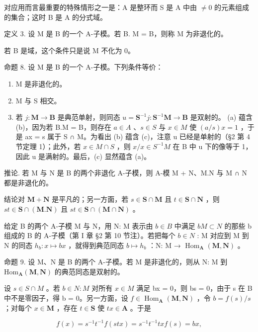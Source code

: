 对应用而言最重要的特殊情形之一是：A 是整环而 S 是 A 中由 \(\neq0\) 的元素组成的集合；这时 B 是 A 的分式域。

定义 3. 设 M 是 B 的一个 A-子模。若 B. M = B，则称 M 为非退化的。

若 B 是域，这个条件只是说 M 不化为 0。

命题 8. 设 M 是 B 的一个 A-子模。下列条件等价：

\begin{enumerate}
\def\labelenumi{(\alph{enumi})}
\item
  M 是非退化的。
\item
  M 与 S 相交。
\item
  若 \(j: \mathbf{M} \to \mathbf{B}\) 是典范单射，则同态 \(u = \mathbf{S}^{-1}j: \mathbf{S}^{-1}\mathbf{M} \to \mathbf{B}\) 是双射的。
  (a) 蕴含 (b)，因为若 B.M = B，则存在 \(a \in A\) 、\(s \in S\) 与 \(x \in M\) 使 \((a/s)x = 1\) ，于是 ax = s 属于 S ∩ M。为看出 (b) 蕴含 (c)，注意 u 已经是单射的（§2 第 4 节定理 1）；此外，若 \(x \in M \cap S\) ，则 \(x/x \in S^{-1}M\) 在 B 中 u 下的像等于 1，因此 u 是满射的。最后，(c) 显然蕴含 (a)。
\end{enumerate}

推论. 若 M 与 N 是 B 的两个非退化 A-子模，则 A-模 M + N、M.N 与 M ∩ N 都是非退化的。

结论对 \(\mathbf{M} + \mathbf{N}\) 是平凡的；另一方面，若 \(s \in \mathbf{S} \cap \mathbf{M}\) 且 \(t \in \mathbf{S} \cap \mathbf{N}\) ，则 \(st \in \mathbf{S} \cap (\mathbf{M}. \mathbf{N})\) 且 \(st \in \mathbf{S} \cap (\mathbf{M} \cap \mathbf{N})\) 。

给定 B 的两个 A-子模 M 与 N，用 N: M 表示由 \(b \in B\) 中满足 \(bM \subset N\) 的那些 b 组成的 B 的 A-子模（第 I 章 §2 第 10 节注）。若把每个 \(b \in N\) : M 对应到 M 到 N 的同态 \(h_{b}: x \mapsto bx\) ，就得到典范同态 \(b \mapsto h_{b}\) ：N: M → \(\operatorname{Hom}_{\mathbf{A}}(\mathbf{M}, \mathbf{N})\) 。

命题 9. 设 M、N 是 B 的两个 A-子模。若 M 是非退化的，则从 N: M 到 \(\mathrm{Hom}_{\mathbf{A}}(\mathbf{M},\mathbf{N})\) 的典范同态是双射的。

设 \(s \in S \cap M\) 。若 \(b \in N: M\) 对所有 \(x \in M\) 满足 bx = 0，则 bs = 0，由于 s 在 B 中不是零因子，得 b = 0。另一方面，设 \(f \in \operatorname{Hom}_{\mathbf{A}}(\mathbf{M}, \mathbf{N})\) ，令 \(b = f(s) / s\) ；对每个 \(x \in \mathbf{M}\) ，存在 \(t \in \mathbf{S}\) 使 \(tx \in \mathbf{A}\) 。于是

\[
f (x) = s ^ {- 1} t ^ {- 1} f (s t x) = s ^ {- 1} t ^ {- 1} t x f (s) = b x,
\]

